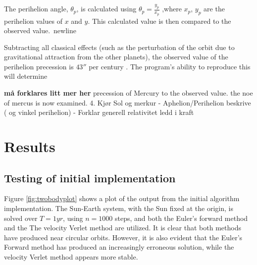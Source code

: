 \documentclass[%
oneside,                 %
final,                   %
10pt]{article}
\begin{document}
The perihelion angle, $\theta_p$, is calculated using $\theta_p=\frac{y_p}{x_p}$ ,where $x_p$, $y_p$ are the perihelion values of $x$ and $y$. This calculated value is then compared to the observed value.\ newline

Subtracting all classical effects (such as the perturbation of the orbit due
to gravitational attraction from the other planets), the observed value of the perihelion
precession is $43''$ per century \cite{HJ-expaper}. The program's ability to reproduce this will determine 

\textbf{må forklares litt mer her}
precession of Mercury to the observed value.  the noe of mercus is now examined.
 4. Kjør Sol og merkur
- Aphelion/Perihelion beskrive ( og vinkel perihelion)
- Forklar generell relativitet ledd i kraft




\section{Results}
\subsection{Testing of initial implementation}
Figure \ref{fig:twobodyplot} shows a plot of the output from the initial algorithm implementation. The Sun-Earth system, with the Sun fixed at the origin, is solved over $T=1 yr$, using $n=1000$ steps, and both the Euler's forward method and the The velocity Verlet method are utilized. It is clear that both methods have produced near circular orbits. However, it is also evident that the Euler's Forward method has produced an increasingly erroneous solution, while the velocity Verlet method appears more stable. \newline
\end{document}
